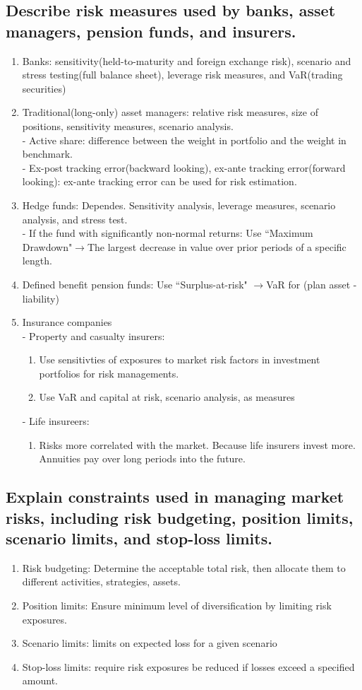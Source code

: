 \documentclass{article}
\newcommand{\be}{\begin{enumerate}}
\newcommand{\ee}{\end{enumerate}}
\newcommand{\ra}{$\rightarrow$}
\begin{document}
\subsection{Describe risk measures used by banks, asset managers, pension funds, and insurers.}
\be
    \item Banks: sensitivity(held-to-maturity and foreign exchange risk), scenario and stress testing(full balance sheet),
     leverage risk measures, and VaR(trading securities)
    \item Traditional(long-only) asset managers: relative risk measures, size of positions, sensitivity measures, scenario analysis.
        \\- Active share: difference between the weight in portfolio and the weight in benchmark.
        \\- Ex-post tracking error(backward looking), ex-ante tracking error(forward looking): ex-ante tracking error
        can be used for risk estimation.
    \item Hedge funds: Dependes. Sensitivity analysis, leverage measures, scenario analysis, and stress test.
        \\- If the fund with significantly non-normal returns: Use ``Maximum Drawdown"\ra The largest
        decrease in value over prior periods of a specific length.
    \item Defined benefit pension funds: Use ``Surplus-at-risk" \ra VaR for (plan asset - liability)
    \item Insurance companies
        \\ - Property and casualty insurers: 
        \be
            \item Use sensitivties of exposures to market risk factors in investment portfolios for risk managements.
            \item Use VaR and capital at risk, scenario analysis,  as measures
        \ee
         - Life insureers: 
        \be
            \item Risks more correlated with the market. Because life insurers invest more. Annuities
            pay over long periods into the future.
        \ee
\ee
\subsection{Explain constraints used in managing market risks, including risk budgeting, position limits, scenario
limits, and stop-loss limits.}
\be
    \item Risk budgeting: Determine the acceptable total risk, then allocate them to different activities, strategies, assets.
    \item Position limits: Ensure minimum level of diversification by limiting risk exposures.
    \item Scenario limits: limits on expected loss for a given scenario
    \item Stop-loss limits: require risk exposures be reduced if losses exceed a specified amount.
\ee
\end{document}

